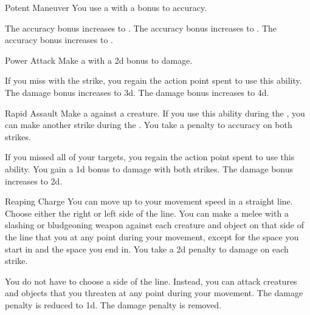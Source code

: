 {            \begin{ability}{Potent Maneuver}
                You use a  with a  bonus to accuracy.

                \rankline
                 The accuracy bonus increases to .
                 The accuracy bonus increases to .
                 The accuracy bonus increases to .
            \end{ability}

            \begin{ability}{Power Attack}
                Make a  with a \plus2d bonus to damage.

                \rankline
                 If you miss with the strike, you regain the action point spent to use this ability.
                 The damage bonus increases to \plus3d.
                 The damage bonus increases to \plus4d.
            \end{ability}

            \begin{ability}{Rapid Assault}
                Make a  against a creature.
                If you use this ability during the , you can make another strike during the .
                You take a  penalty to accuracy on both strikes.

                \rankline
                 If you missed all of your targets, you regain the action point spent to use this ability.
                 You gain a \plus1d bonus to damage with both strikes.
                 The damage bonus increases to \plus2d.
            \end{ability}

            \begin{ability}{Reaping Charge}
                You can move up to your movement speed in a straight line.
                Choose either the right or left side of the line.
                You can make a melee  with a slashing or bludgeoning weapon against each creature and object on that side of the line that you  at any point during your movement, except for the space you start in and the space you end in.
                You take a \minus2d penalty to damage on each strike.

                \rankline
                 You do not have to choose a side of the line.
                Instead, you can attack creatures and objects that you threaten at any point during your movement.
                 The damage penalty is reduced to \minus1d.
                 The damage penalty is removed.
            \end{ability}

}
